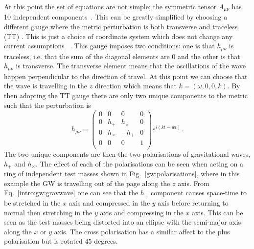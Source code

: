 At this point the set of equations are not simple; the symmetric tensor $A_{\mu \nu}$ has 10 independent
components~. This can be greatly
simplified by choosing a different gauge where the metric perturbation is both
transverse and traceless (TT) \citep{flanagan2005BasicsGravitational}.  This is
just a choice of coordinate system which does not change any current
assumptions ~. This gauge imposes two conditions: one
is that $h_{\mu \nu}$ is traceless, i.e. that the sum of the diagonal elements
are 0 and the other is that $h_{\mu \nu}$ is transverse.  The transverse
element means that the oscillations of the wave happen perpendicular to the
direction of travel.  At this point we can choose that the wave is travelling in
the $z$ direction which means that $k = (\omega,0,0,k)$.  By then adopting the
TT gauge there are only two unique components to the metric such that the
perturbation is
\begin{equation}
\label{intro:gw:gravwave}
h_{\mu \nu} = \left( 
\begin{matrix}
0 & 0 & 0 & 0 \\
0 & h_{+} & h_{\times} & 0 \\
0 & h_{\times} & -h_{+} & 0 \\
0 & 0 & 0 & 1 \\
\end{matrix}
\right) 
e^{i(kt - wt)}.
\end{equation}
The two unique components are then the two polarisations of gravitational
waves, $h_{+}$ and $h_{\times}$. The effect of each of the polarisations can be seen when acting on a ring of independent test masses shown in Fig.~\ref{gw:polarisations}, where in this example the \gls{GW} is travelling out of the page along the $z$ axis.
From Eq.~\ref{intro:gw:gravwave} one can see that the $h_{+}$ component causes space-time to be stretched in the $x$ axis and compressed in the $y$ axis before returning to normal then stretching in the $y$ axis and compressing in the $x$ axis. This can be seen as the test masses being distorted into an ellipse with the semi-major axis along the $x$ or $y$ axis.
The cross polarisation has a similar affect to the plus polarisation but is rotated 45 degrees.
%
